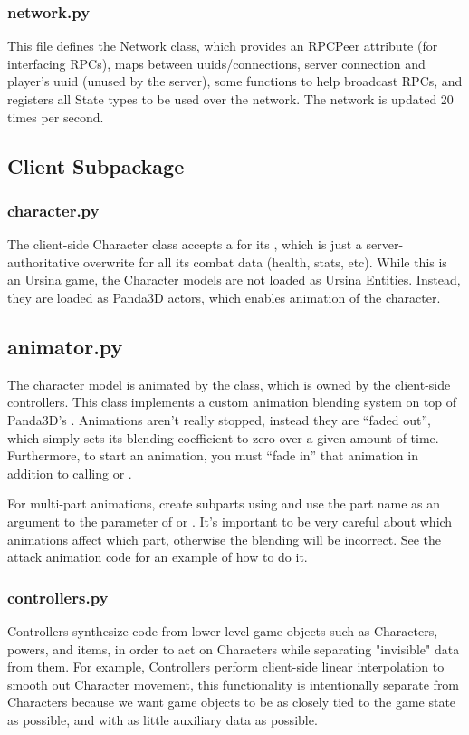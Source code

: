 \documentclass{article}
\begin{document}
\subsubsection{network.py}
This file defines the Network class, which provides an RPCPeer attribute (for interfacing
RPCs), maps between uuids/connections, server connection and player's uuid (unused by
the server), some functions to help broadcast RPCs, and registers all State types to
be used over the network. The network is updated 20 times per second.

\subsection{Client Subpackage}
\subsubsection{character.py}
The client-side Character class accepts a  for its ,
which is just a server-authoritative overwrite for all its combat data (health, stats, etc).
While this is an Ursina game, the Character models are not loaded as Ursina Entities. Instead,
they are loaded as Panda3D actors, which enables animation of the character. 
\subsection{animator.py}
The character model is animated by the  class, which is owned by the client-side
controllers. This class implements a custom animation blending system on top of Panda3D's
. Animations aren't really stopped, instead they are ``faded
out'', which simply sets its blending coefficient to zero over a given amount of time.
Furthermore, to start an animation, you must ``fade in'' that animation in addition to calling
 or .

For multi-part animations, create subparts using  and use the
part name as an argument to the  parameter of  or
. It's important to be very careful about which animations affect
which part, otherwise the blending will be incorrect. See the attack animation code for
an example of how to do it.

\subsubsection{controllers.py}
Controllers synthesize code from lower level game objects such as Characters, powers, and items,
in order to act on Characters while separating "invisible" data from them. For example, Controllers
perform client-side linear interpolation to smooth out Character movement, this functionality is
intentionally separate from Characters because we want game objects to be as closely tied to the
game state as possible, and with as little auxiliary data as possible.
\end{document}
